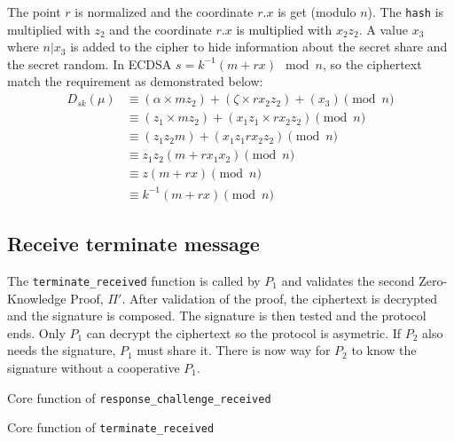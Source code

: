 The point $r$ is normalized and the coordinate $r.x$ is get (modulo $n$). The \texttt{hash}
is multiplied with $z_2$ and the coordinate $r.x$ is multiplied with $x_2z_2$.
A value $x_3$ where $n|x_3$ is added to the cipher to hide information about the
secret share and the secret random. In ECDSA $s = k^{-1}(m + rx) \mod n$, so the
ciphertext match the requirement as demonstrated below:
\begin{equation*}
\begin{split}
  D_{sk}(\mu) &\equiv (\alpha \times mz_2) + (\zeta \times rx_2z_2) + (x_3) \pmod n \\
              &\equiv (z_1 \times mz_2) + (x_1z_1 \times rx_2z_2) \pmod n \\
              &\equiv (z_1z_2m) + (x_1z_1rx_2z_2) \pmod n \\
              &\equiv z_1z_2(m + rx_1x_2) \pmod n \\
              &\equiv z(m + rx) \pmod n \\
              &\equiv k^{-1}(m + rx) \pmod n
\end{split}
\end{equation*}

\subsection{Receive terminate message}

The \texttt{terminate\_received} function is called by $P_1$ and validates the
second Zero-Knowledge Proof, $\Pi'$. After validation of the proof, the ciphertext
is decrypted and the signature is composed. The signature is then tested and the
protocol ends. Only $P_1$ can decrypt the ciphertext so the protocol is asymetric.
If $P_2$ also needs the signature, $P_1$ must share it. There is now way for $P_2$
to know the signature without a cooperative $P_1$.

\begin{listing}
	\caption{Core function of \texttt{response\_challenge\_received}}
	\label{lst:implRespChallengeReceivedFunc}
\end{listing}

\begin{listing}
	\caption{Core function of \texttt{terminate\_received}}
	\label{lst:implTerminateReceivedFunc}
\end{listing}
\newpage
